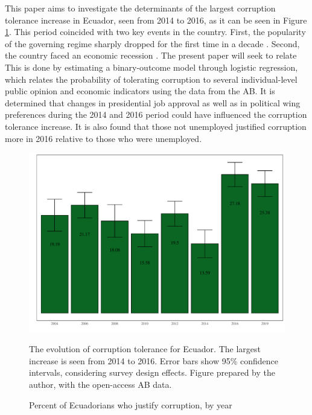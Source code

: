 \documentclass[12pt,a4]{article}\usepackage[]{graphicx}\usepackage[]{xcolor}
\makeatletter
\def\maxwidth{ %
  \ifdim\Gin@nat@width>\linewidth
    \linewidth
  \else
    \Gin@nat@width
  \fi
}
\newenvironment{knitrout}{}{} %
\makeatother
\begin{document}
This paper aims to investigate the determinants of the largest corruption tolerance increase in Ecuador, seen from 2014 to 2016, as it can be seen in Figure \ref{fig:ctoly}. This period coincided with two key events in the country. First, the popularity of the governing regime sharply dropped for the first time in a decade \parencite{Quillupangui.2016}. Second, the country faced an economic recession \parencite{Weisbrot.2017}. The present paper will seek to relate  This is done by estimating a binary-outcome model through logistic regression, which relates the probability of tolerating corruption to several individual-level public opinion and economic indicators using the data from the AB. It is determined that changes in presidential job approval as well as in political wing preferences during the 2014 and 2016 period could have influenced the corruption tolerance increase. It is also found that those not unemployed justified corruption more in 2016 relative to those who were unemployed.


\begin{figure}[htbp]
\label{fig:ctoly}
\caption{Percent of Ecuadorians who justify corruption, by year}
\begin{knitrout}
\color{fgcolor}

{\centering \includegraphics[width=\maxwidth]{figure/ctol_graph-1} 

}


\end{knitrout}


The evolution of corruption tolerance for Ecuador. The largest increase is seen from 2014 to 2016. Error bars show 95\% confidence intervals, considering survey design effects. Figure prepared by the author, with the open-access AB data.
\end{figure}
\end{document}
